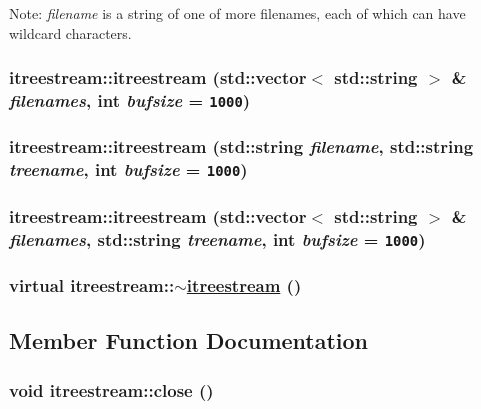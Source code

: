 Note: {\em filename\/} is a string of one of more filenames, each of which can have wildcard characters. \hypertarget{classitreestream_a2}{
\subsubsection[itreestream]{\setlength{\rightskip}{0pt plus 5cm}itreestream::itreestream (std::vector$<$ std::string $>$ \& {\em filenames}, int {\em bufsize} = {\tt 1000})}}
\label{classitreestream_a2}


\hypertarget{classitreestream_a3}{
\subsubsection[itreestream]{\setlength{\rightskip}{0pt plus 5cm}itreestream::itreestream (std::string {\em filename}, std::string {\em treename}, int {\em bufsize} = {\tt 1000})}}
\label{classitreestream_a3}


\hypertarget{classitreestream_a4}{
\subsubsection[itreestream]{\setlength{\rightskip}{0pt plus 5cm}itreestream::itreestream (std::vector$<$ std::string $>$ \& {\em filenames}, std::string {\em treename}, int {\em bufsize} = {\tt 1000})}}
\label{classitreestream_a4}


\hypertarget{classitreestream_a5}{
\subsubsection[$\sim$itreestream]{\setlength{\rightskip}{0pt plus 5cm}virtual itreestream::$\sim$\hyperlink{classitreestream}{itreestream} ()}}
\label{classitreestream_a5}




\subsection{Member Function Documentation}
\hypertarget{classitreestream_a19}{
\subsubsection[close]{\setlength{\rightskip}{0pt plus 5cm}void itreestream::close ()}}
\label{classitreestream_a19}


